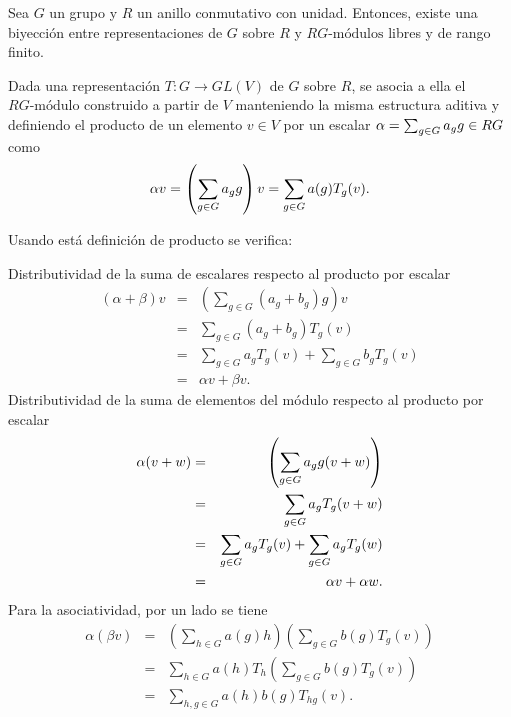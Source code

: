 \begin{proposicion}\label{prop:biyeccionModulos}
 Sea $G$ un grupo y $R$ un anillo conmutativo con unidad. Entonces, existe una biyección entre representaciones de $G$ sobre $R$ y $RG\mbox{-módulos}$ libres y de rango finito. 
 \end{proposicion}
 \begin{proof*}
 Dada una representación $T \colon G \to GL(V)$ de $G$ sobre $R$, se asocia a ella el $RG\mbox{-módulo}$ construido a partir de $V$ manteniendo la misma estructura aditiva y definiendo el producto de un elemento $v \in V$ por un escalar $\alpha = \sum_{g \in G} a_{g} g \in RG$ como 
 \begin{equation}\label{defproducto}
 \alpha v = \left( \sum_{g \in G} a_{g} g  \right)v = \sum_{g \in G}a(g)T_g(v).
 \end{equation}
 
 Usando está definición de producto se verifica:
 \begin{bulletList}
 \newItem Distributividad de la suma de escalares respecto al producto por escalar \begin{eqnarray*}
  (\alpha + \beta)v &=& \left( \sum_{g \in G}(a_g + b_g)g  \right)v \\
   &=& \sum_{g \in G}(a_g + b_g)T_g(v) \\
   &=& \sum_{g \in G}a_gT_g(v) + \sum_{g \in G}b_gT_g(v) \\
    &=& \alpha v + \beta v .
 \end{eqnarray*}
 \newItem Distributividad de la  suma de elementos del módulo respecto al producto por escalar
 \begin{eqnarray*}
 \alpha(v + w) &=& \left(\sum_{g \in G} a_{g} g(v + w)  \right) \\
  &=& \sum_{g \in G}a_gT_g(v+w) \\
  &=& \sum_{g \in G}a_gT_g(v) + \sum_{g \in G}a_gT_g(w) \\
  &=& \alpha v + \alpha w .
 \end{eqnarray*}
 \newItem Para la asociatividad, por un lado se tiene
 \begin{eqnarray*}
 \alpha(\beta v) &=& \left( \sum_{h \in G}a(g)h \right)\left( \sum_{g \in G}b(g)T_g(v) \right) \\
  &=& \sum_{h \in G}a(h)T_h\left( \sum_{g \in G}b(g)T_g(v)  \right) \\
  &=& \sum_{h, g \in G}a(h)b(g)T_{hg}(v).
 \end{eqnarray*}
 

\end{bulletList}
\end{proof*}
